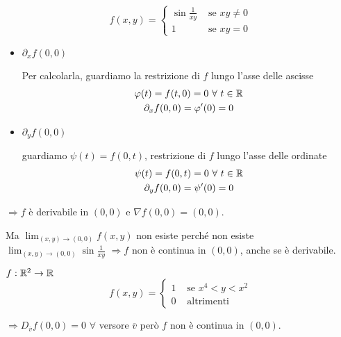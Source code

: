 \begin{exbar}
\begin{example}
	\begin{equation*}
		f(x,y)=
		\begin{cases}
			\sin\frac{1}{xy}&\text{  se  }xy\neq0
			\\
			1& \text{  se  }xy=0
		\end{cases}
	\end{equation*}
	
	\begin{itemize} 
		\item $\partial_{x}f(0,0)$
		
		Per calcolarla, guardiamo la restrizione di $f$ lungo l'asse delle ascisse
		\begin{gather*}
			\varphi(t)=f(t,0)=0\,\,\forall\,\,t\in\mathbb{R}
			\\
			\partial_xf(0,0)=\varphi'(0)=0
		\end{gather*}
		
		\item $\partial_yf(0,0)$
		
		guardiamo $\psi(t)=f(0,t)$, restrizione di $f$ lungo l'asse delle ordinate
		\begin{gather*}
			\psi(t)=f(0,t)=0\,\,\forall\,\, t \in \mathbb{R}
	 		\\
			\partial_yf(0,0)=\psi'(0)=0
		\end{gather*}
	\end{itemize}
	
	$\Rightarrow f$ è derivabile in $(0,0)$ e $\nabla f(0,0)=(0,0)$. 
	
	Ma $\lim_{(x,y)\rightarrow(0,0)}f(x,y)$ non esiste perché non esiste $\lim_{(x,y)\rightarrow(0,0)}\sin\frac{1}{xy}$ $\Rightarrow f$ non è continua in $(0,0)$, anche se è derivabile.  
\end{example}
\end{exbar}


\begin{exbar}
	{$f:\mathbb{R}^2\rightarrow\mathbb{R}$
		\begin{equation*}
			f(x,y)=
			\begin{cases}
				1&\text{  se  }x^4<y<x^2
				\\
				0 &\text{  altrimenti}
			\end{cases}
		\end{equation*}

		\segnaposto %
		
		$\Rightarrow D_{\overline{v}}f(0,0)=0\,\,\forall$ versore $\overline{v}$ però $f$ non è continua in $(0,0)$.}
\end{exbar}


